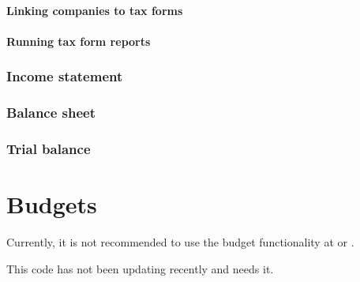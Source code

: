 \subsubsection{Linking companies to tax forms}
\label{subsubsec-business-processes-accounting-reporting-tax-linking-taxforms}

\subsubsection{Running tax form reports}
\label{subsubsec-business-processes-accounting-reporting-tax-running-taxforms}


\subsection{Income statement}
\label{subsec-business-processes-accounting-reporting-result}


\subsection{Balance sheet}
\label{subsec-business-processes-accounting-reporting-balance}

\subsection{Trial balance}
\label{subsec-business-processes-accounting-reporting-trial-balance}

\chapter{Budgets}
\label{cha-business-processes-budget}

Currently, it is not recommended to use the budget  functionality at  or .

This code has not been updating recently and needs it.
